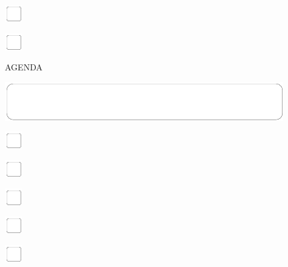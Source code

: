 \documentclass[11pt,titlepage]{article}
\begin{document}
\vspace{10mm}

\noindent
\includegraphics[]{checkbox-4mm.pdf}

\vspace{10mm}

\noindent
\includegraphics[]{checkbox-4mm.pdf}

\pagebreak

\small
\hfill AGENDA

\vspace{6mm}

\noindent
\includegraphics[]{mediumbox.pdf}

\vspace{15mm}

\noindent
\includegraphics[]{checkbox-4mm.pdf}

\vspace{10mm}

\noindent
\includegraphics[]{checkbox-4mm.pdf}

\vspace{10mm}

\noindent
\includegraphics[]{checkbox-4mm.pdf}

\vspace{10mm}

\noindent
\includegraphics[]{checkbox-4mm.pdf}

\vspace{10mm}

\noindent
\includegraphics[]{checkbox-4mm.pdf}
\end{document}

